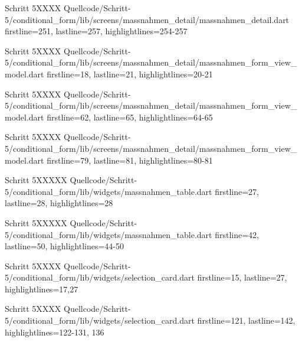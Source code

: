   \begin{alexlisting}{Schritt 5}{XXXX}
    {Quellcode/Schritt-5/conditional_form/lib/screens/massnahmen_detail/massnahmen_detail.dart}
    {firstline=251, lastline=257, highlightlines={254-257}}
    \label{lst:Schritt5XXXXX}
  \end{alexlisting}


  \begin{alexlisting}{Schritt 5}{XXXX}
    {Quellcode/Schritt-5/conditional_form/lib/screens/massnahmen_detail/massnahmen_form_view_model.dart}
    {firstline=18, lastline=21, highlightlines={20-21}}
    \label{lst:Schritt5XXXXX}
  \end{alexlisting}

  \begin{alexlisting}{Schritt 5}{XXXX}
    {Quellcode/Schritt-5/conditional_form/lib/screens/massnahmen_detail/massnahmen_form_view_model.dart}
    {firstline=62, lastline=65, highlightlines={64-65}}
    \label{lst:Schritt5XXXXX}
  \end{alexlisting}

  \begin{alexlisting}{Schritt 5}{XXXX}
    {Quellcode/Schritt-5/conditional_form/lib/screens/massnahmen_detail/massnahmen_form_view_model.dart}
    {firstline=79, lastline=81, highlightlines={80-81}}
    \label{lst:Schritt5XXXXX}
  \end{alexlisting}

  \begin{alexlisting}{Schritt 5}{XXXXX}
    {Quellcode/Schritt-5/conditional_form/lib/widgets/massnahmen_table.dart}
    {firstline=27, lastline=28, highlightlines={28}}
    \label{lst:Schritt5XXXXX}
  \end{alexlisting}

  \begin{alexlisting}{Schritt 5}{XXXXX}
    {Quellcode/Schritt-5/conditional_form/lib/widgets/massnahmen_table.dart}
    {firstline=42, lastline=50, highlightlines={44-50}}
    \label{lst:Schritt5XXXXX}
  \end{alexlisting}

  \begin{alexlisting}{Schritt 5}{XXXX}
    {Quellcode/Schritt-5/conditional_form/lib/widgets/selection_card.dart}
    {firstline=15, lastline=27, highlightlines={17,27}}
    \label{lst:Schritt5XXXX}
\end{alexlisting}

\begin{alexlisting}{Schritt 5}{XXXX}
    {Quellcode/Schritt-5/conditional_form/lib/widgets/selection_card.dart}
    {firstline=121, lastline=142, highlightlines={122-131, 136}}
    \label{lst:Schritt5XXXX}
\end{alexlisting}

\clearpage 
